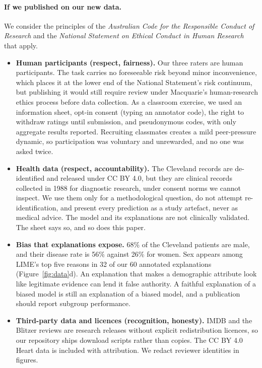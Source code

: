 \paragraph{If we published on our new data.} We consider the principles of the \emph{Australian Code for the Responsible Conduct of Research} \citep{nhmrc2018} and the \emph{National Statement on Ethical Conduct in Human Research} \citep{nhmrc2025} that apply.
\begin{itemize}\itemsep1pt
\item \textbf{Human participants (respect, fairness).} Our three raters are human participants. The task carries no foreseeable risk beyond minor inconvenience, which places it at the lower end of the National Statement's risk continuum, but publishing it would still require review under Macquarie's human-research ethics process before data collection. As a classroom exercise, we used an information sheet, opt-in consent (typing an annotator code), the right to withdraw ratings until submission, and pseudonymous codes, with only aggregate results reported. Recruiting classmates creates a mild peer-pressure dynamic, so participation was voluntary and unrewarded, and no one was asked twice.
\item \textbf{Health data (respect, accountability).} The Cleveland records are de-identified and released under CC BY 4.0, but they are clinical records collected in 1988 for diagnostic research, under consent norms we cannot inspect. We use them only for a methodological question, do not attempt re-identification, and present every prediction as a study artefact, never as medical advice. The model and its explanations are not clinically validated. The sheet says so, and so does this paper.
\item \textbf{Bias that explanations expose.} 68\% of the Cleveland patients are male, and their disease rate is 56\% against 26\% for women. Sex appears among LIME's top five reasons in 32 of our 60 annotated explanations (Figure~\ref{fig:data}d). An explanation that makes a demographic attribute look like legitimate evidence can lend it false authority. A faithful explanation of a biased model is still an explanation of a biased model, and a publication should report subgroup performance.
\item \textbf{Third-party data and licences (recognition, honesty).} IMDB and the Blitzer reviews are research releases without explicit redistribution licences, so our repository ships download scripts rather than copies. The CC BY 4.0 Heart data is included with attribution. We redact reviewer identities in figures.

\end{itemize}
